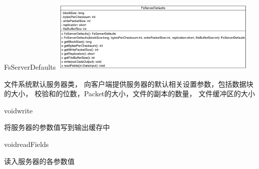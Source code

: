 \begin{XeClass}{FsServerDefaults}
\includegraphics[width=10cm]{cdig/FsServerDefaults.png}
     
 文件系统默认服务器类，
 向客户端提供服务器的默认相关设置参数，包括数据块的大小，
 校验和的位数，Packet的大小，文件的副本的数量，
 文件缓冲区的大小

    \begin{XeMethod}{\XePublic}{void}{write}
         
 将服务器的参数值写到输出缓存中

    \end{XeMethod}

    \begin{XeMethod}{\XePublic}{void}{readFields}
         
 读入服务器的各参数值

    \end{XeMethod}

\end{XeClass}
